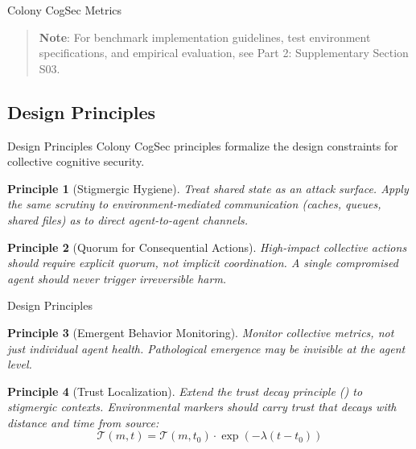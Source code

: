 \documentclass[
  ignorenonframetext,
]{beamer}
\providecommand{\cref}[1]{\texttt{\detokenize{#1}}}
\newtheorem{principle}{Principle}
\begin{document}
\begin{frame}[allowframebreaks]{Colony CogSec Metrics}
\begin{quote}
\textbf{Note}: For benchmark implementation guidelines, test environment
specifications, and empirical evaluation, see Part 2: Supplementary
Section S03.
\end{quote}
\end{frame}

\begin{frame}
\end{frame}

\subsection{Design Principles}\label{sec:design-principles}

\begin{frame}[allowframebreaks]{Design Principles}
Colony CogSec principles formalize the design constraints for collective
cognitive security.

\begin{principle}[Stigmergic Hygiene]
\label{principle:stigmergic-hygiene}
Treat shared state as an attack surface. Apply the same scrutiny to environment-mediated communication (caches, queues, shared files) as to direct agent-to-agent channels.
\end{principle}

\begin{principle}[Quorum for Consequential Actions]
\label{principle:quorum}
High-impact collective actions should require explicit quorum, not implicit coordination. A single compromised agent should never trigger irreversible harm.
\end{principle}

\end{frame}

\begin{frame}[allowframebreaks]{Design Principles}
\begin{principle}[Emergent Behavior Monitoring]
\label{principle:emergent-monitoring}
Monitor collective metrics, not just individual agent health. Pathological emergence may be invisible at the agent level.
\end{principle}

\begin{principle}[Trust Localization]
\label{principle:trust-localization}
Extend the trust decay principle (\cref{thm:trust-bounded}) to stigmergic contexts. Environmental markers should carry trust that decays with distance and time from source:
\begin{equation}
\mathcal{T}(m, t) = \mathcal{T}(m, t_0) \cdot \exp(-\lambda(t - t_0))
\label{eq:stigmergic-trust-decay}
\end{equation}
\end{principle}
\end{frame}
\end{document}
